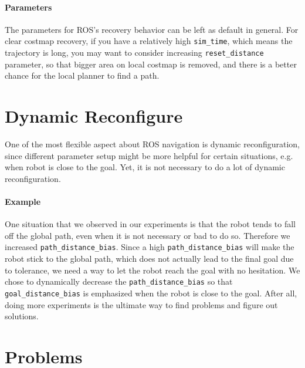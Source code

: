 \documentclass[12pt]{article}
\begin{document}
\paragraph{Parameters} The parameters for ROS's recovery behavior can be left as default in general. For clear costmap recovery, if you have a relatively
high \texttt{sim\_time}, which means the trajectory is long, you may want to consider increasing \texttt{reset\_distance} parameter, so that bigger area on local costmap is removed, and there is a
better chance for the local planner to find a path.

\section{Dynamic Reconfigure}

One of the most flexible aspect about ROS navigation is dynamic reconfiguration, since different parameter setup might be more helpful for certain situations, e.g. when robot is close to the goal. Yet, it is not necessary to do a lot of dynamic reconfiguration. 

\paragraph{Example} One situation that we observed in our experiments is that the robot tends to fall off the global path,
even when it is not necessary or bad to do so. Therefore we increased \texttt{path\_distance\_bias}. Since a high \texttt{path\_distance\_bias} will make the robot stick to the global path, which does not actually lead to the final goal due to tolerance, we need a way to let the robot reach the goal with no hesitation. We chose to dynamically
decrease the \texttt{path\_distance\_bias} so that \texttt{goal\_distance\_bias} is emphasized when the robot is close to the goal. After all, doing more experiments is the ultimate way to find problems and figure out solutions.

\section{Problems}
\end{document}
